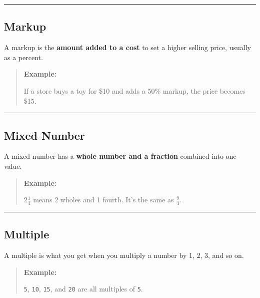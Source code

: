 \documentclass[
  letterpaper,
  DIV=11,
  numbers=noendperiod]{scrreprt}
\begin{document}
\begin{center}\rule{0.5\linewidth}{0.5pt}\end{center}

\subsection*{Markup}\label{glossary-markup}

A markup is the \textbf{amount added to a cost} to set a higher selling
price, usually as a percent.

\begin{quote}
\textbf{Example:}

If a store buys a toy for \$10 and adds a 50\% markup, the price becomes
\$15.
\end{quote}

\begin{center}\rule{0.5\linewidth}{0.5pt}\end{center}

\subsection*{Mixed Number}\label{glossary-mixed-number}

A mixed number has a \textbf{whole number and a fraction} combined into
one value.

\begin{quote}
\textbf{Example:}

\(2\frac{1}{4}\) means 2 wholes and 1 fourth. It's the same as
\(\frac{9}{4}\).
\end{quote}

\begin{center}\rule{0.5\linewidth}{0.5pt}\end{center}

\subsection*{Multiple}\label{glossary-multiple}

A multiple is what you get when you multiply a number by 1, 2, 3, and so
on.

\begin{quote}
\textbf{Example:}

\texttt{5}, \texttt{10}, \texttt{15}, and \texttt{20} are all multiples
of \texttt{5}.
\end{quote}
\end{document}
